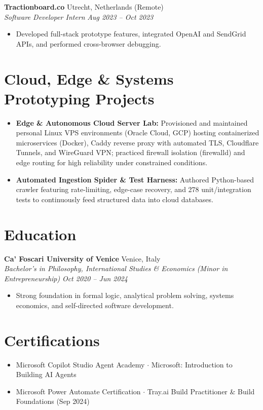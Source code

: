 \documentclass[10pt, a4paper]{article}
\begin{document}
\vspace{3pt}
\textbf{Tractionboard.co} \hfill Utrecht, Netherlands (Remote) \\
\textit{Software Developer Intern} \hfill \textit{Aug 2023 -- Oct 2023}
\begin{itemize}
    \item Developed full-stack prototype features, integrated OpenAI and SendGrid APIs, and performed cross-browser debugging.
\end{itemize}

\section*{Cloud, Edge \& Systems Prototyping Projects}
\begin{itemize}
    \item \textbf{Edge \& Autonomous Cloud Server Lab:} Provisioned and maintained personal Linux VPS environments (Oracle Cloud, GCP) hosting containerized microservices (Docker), Caddy reverse proxy with automated TLS, Cloudflare Tunnels, and WireGuard VPN; practiced firewall isolation (firewalld) and edge routing for high reliability under constrained conditions.
    \item \textbf{Automated Ingestion Spider \& Test Harness:} Authored Python-based crawler featuring rate-limiting, edge-case recovery, and 278 unit/integration tests to continuously feed structured data into cloud databases.
\end{itemize}

\section*{Education}
\textbf{Ca' Foscari University of Venice} \hfill Venice, Italy \\
\textit{Bachelor's in Philosophy, International Studies \& Economics (Minor in Entrepreneurship)} \hfill \textit{Oct 2020 -- Jun 2024}
\begin{itemize}
    \item Strong foundation in formal logic, analytical problem solving, systems economics, and self-directed software development.
\end{itemize}

\section*{Certifications}
\begin{itemize}
    \item Microsoft Copilot Studio Agent Academy $\cdot$ Microsoft: Introduction to Building AI Agents
    \item Microsoft Power Automate Certification $\cdot$ Tray.ai Build Practitioner \& Build Foundations (Sep 2024)
\end{itemize}
\end{document}
